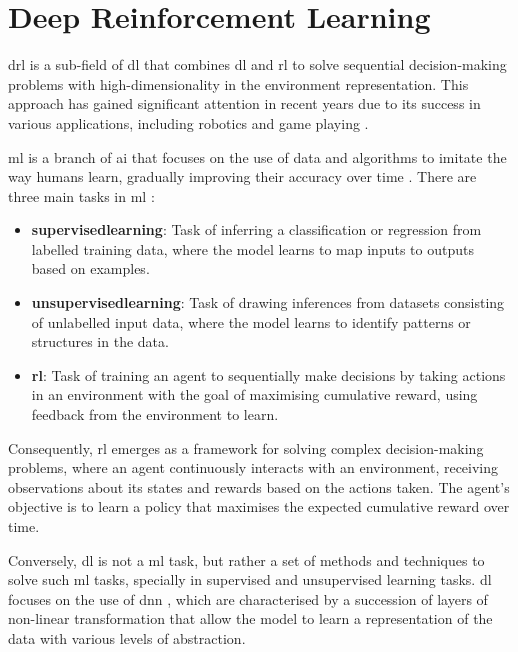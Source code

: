\section{Deep Reinforcement Learning} \label{sec:deepreinforcementlearning}

\acrfull{drl} is a sub-field of \acrfull{dl} that combines \acrfull{dl} and \acrfull{rl} to solve sequential decision-making problems with high-dimensionality in the environment representation. This approach has gained significant attention in recent years due to its success in various applications, including robotics \cite{Tang2024} and game playing \cite{Silver2016, Shao2019}.

\acrlong{ml} is a branch of \acrfull{ai} that focuses on the use of data and algorithms to imitate the way humans learn, gradually improving their accuracy over time \cite{IBM2021}. There are three main tasks in \acrshort{ml} \cite{Francois-Lavet2018}:

\begin{itemize}
    \item \textbf{\Gls{supervisedlearning}}: Task of inferring a classification or regression from labelled training data, where the model learns to map inputs to outputs based on examples.
    \item \textbf{\Gls{unsupervisedlearning}}: Task of drawing inferences from datasets consisting of unlabelled input data, where the model learns to identify patterns or structures in the data.
    \item \textbf{\acrlong{rl}}: Task of training an agent to sequentially make decisions by taking actions in an environment with the goal of maximising cumulative reward, using feedback from the environment to learn.
\end{itemize}

Consequently, \acrshort{rl} emerges as a framework for solving complex decision-making problems, where an agent continuously interacts with an environment, receiving observations about its states and rewards based on the actions taken. The agent's objective is to learn a policy that maximises the expected cumulative reward over time.

Conversely, \acrlong{dl} is not a \acrshort{ml} task, but rather a set of methods and techniques to solve such \acrshort{ml} tasks, specially in supervised and unsupervised learning tasks. \acrshort{dl} focuses on the use of \acrfull{dnn} \cite{Goodfellow2016}, which are characterised by a succession of layers of non-linear transformation that allow the model to learn a representation of the data with various levels of abstraction.

